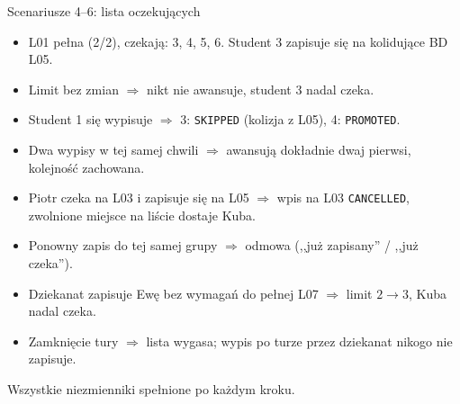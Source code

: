 \documentclass[aspectratio=169,11pt]{beamer}
\newcommand{\good}[1]{\textcolor{ok}{#1}}
\begin{document}
\begin{frame}{Scenariusze 4--6: lista oczekujących}
  \small
  \begin{itemize}
    \item L01 pełna (2/2), czekają: 3, 4, 5, 6. Student 3 zapisuje się na kolidujące BD L05.
    \item Limit bez zmian $\Rightarrow$ nikt nie awansuje, student 3 \good{nadal czeka}.
    \item Student 1 się wypisuje $\Rightarrow$ 3: \texttt{SKIPPED} (kolizja z L05), 4: \texttt{PROMOTED}.
    \item Dwa wypisy w tej samej chwili $\Rightarrow$ awansują dokładnie dwaj pierwsi, kolejność zachowana.
    \item Piotr czeka na L03 i zapisuje się na L05 $\Rightarrow$ wpis na L03 \texttt{CANCELLED}, zwolnione miejsce na liście dostaje Kuba.
    \item Ponowny zapis do tej samej grupy $\Rightarrow$ odmowa (,,już zapisany'' / ,,już czeka'').
    \item Dziekanat zapisuje Ewę bez wymagań do pełnej L07 $\Rightarrow$ limit $2 \to 3$, Kuba nadal czeka.
    \item Zamknięcie tury $\Rightarrow$ lista wygasa; wypis po turze przez dziekanat nikogo nie zapisuje.
  \end{itemize}
  \begin{exampleblock}{}
    Wszystkie niezmienniki spełnione po każdym kroku.
  \end{exampleblock}
\end{frame}
\end{document}
